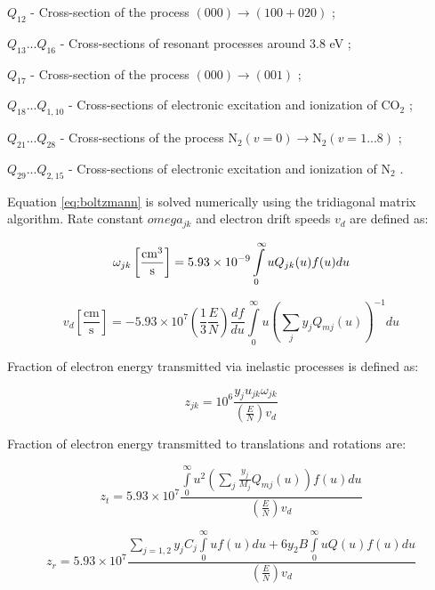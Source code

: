 \documentclass{report}
\begin{document}
$Q_{12}$ - Cross-section of the process $(000)\rightarrow(100+020)$  \cite{Lowke-1973};

$Q_{13}...Q_{16}$ - Cross-sections of resonant processes around 3.8 eV  \cite{Lowke-1973};

$Q_{17}$ - Cross-section of the process $(000)\rightarrow(001)$  \cite{Lowke-1973};

$Q_{18}...Q_{1,10}$ - Cross-sections of electronic excitation and ionization of {CO$_2$}  \cite{Hake-1967};

$Q_{21}...Q_{28}$ - Cross-sections of the process {N$_2$}$(v=0)\rightarrow${N$_2$}$(v=1...8)$ \cite{Phelps-1968,Schulz-1962,Engelhardt-1964};

$Q_{29}...Q_{2,15}$ - Cross-sections of electronic excitation and ionization of {N$_2$} \cite{Engelhardt-1964}.  

Equation \ref{eq:boltzmann} is solved numerically using the tridiagonal matrix algorithm.
Rate constant $omega_{jk}$ and electron drift speeds $v_d$ are defined as:

\begin{equation}\label{eq:omega_jk}
\omega _{jk}\left[\frac{\rm{cm}^3}{\text{s}} \right] = 5.93 \times 10^{-9}\int\limits_0^\infty u Q_{jk}(u)f(u)du
\end{equation}
     
\begin{equation}\label{eq:v_d}
v_d \left[ \frac{\text{cm}}{\text{s}} \right] =  - 5.93 \times 10^7 \left( \frac{1}{3}\frac{E}{N} \right)\frac{df}{du} \int\limits_0^\infty u \left( \sum\limits_j y_j Q_{mj}(u) \right)^{-1} du
\end{equation}

Fraction of electron energy transmitted via inelastic processes is defined as:

\begin{equation}\label{eq:z_jk}
z_{jk} = 10^6 \frac{y_j u_{jk} \omega _{jk}} {\left( \frac{E}{N} \right) v_d}   
\end{equation}

Fraction of electron energy transmitted to translations and rotations are:

\begin{equation}\label{eq:z_t}
z_t = 5.93 \times 10^7 \frac{\int\limits_0^\infty u^2 \left( \sum\limits_j \frac{y_j}{M_j} Q_{mj}(u) \right)f(u)du} {\left( \frac{E}{N} \right) v_d}
\end{equation}

\begin{equation}\label{eq:z_r}
z_r = 5.93 \times 10^7 \frac{\sum\limits_{j=1,2} y_j C_j \int\limits_0^\infty uf(u)du + 6 y_2 B \int\limits_0^\infty u Q(u) f(u) du} {\left( \frac{E}{N} \right) v_d} 
\end{equation}
\end{document}
